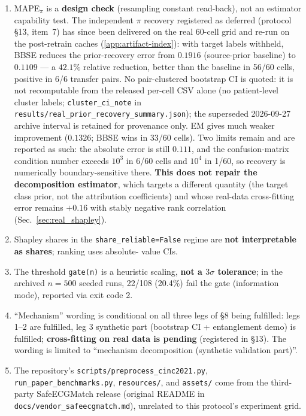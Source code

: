 \documentclass[final,5p,times,nonatbib]{elsarticle}
\begin{document}
\begin{enumerate}
    \item MAPE$_\pi$ is a \textbf{design check} (resampling constant
    read-back), not an estimator capability test. The independent $\pi$
    recovery registered as deferred (protocol \S13, item~7) has since
    been delivered on the real 60-cell grid and re-run on the
    post-retrain caches
    (\ref{app:artifact-index}): with target labels withheld,
    BBSE reduces the prior-recovery error from $0.1916$ (source-prior
    baseline) to $0.1109$ --- a $42.1\%$ relative reduction, better than
    the baseline in 56/60 cells, positive in 6/6 transfer pairs. No
    pair-clustered bootstrap CI is quoted: it is not recomputable from
    the released per-cell CSV alone (no patient-level cluster labels;
    \texttt{cluster\_ci\_note} in
    \texttt{results/real\_prior\_recovery\_summary.json}); the superseded
    2026-09-27 archive interval is retained for provenance only.
    EM gives much
    weaker improvement ($0.1326$; BBSE wins in 33/60 cells). Two limits
    remain and are reported as such:
    the absolute error is still $0.111$, and the confusion-matrix
    condition number exceeds $10^3$ in 6/60 cells and $10^4$ in 1/60, so
    recovery is numerically boundary-sensitive there. \textbf{This does
    not repair the decomposition estimator}, which targets a different
    quantity (the target class prior, not the attribution coefficients)
    and whose real-data cross-fitting error remains $+0.16$ with stably
    negative rank correlation (Sec.~\ref{sec:real_shapley}).
    \item Shapley shares in the \texttt{share\_reliable=False} regime
    are \textbf{not interpretable as shares}; ranking uses absolute-
    value CIs.
    \item The threshold \texttt{gate(n)} is a heuristic scaling,
    \textbf{not a $3\sigma$ tolerance}; in the archived $n=500$
    seeded runs, 22/108 (20.4\%) fail the gate (information mode),
    reported via exit code 2.
    \item ``Mechanism'' wording is conditional on all three legs of
    \S8 being fulfilled: legs 1--2 are fulfilled, leg 3 synthetic part
    (bootstrap CI + entanglement demo) is fulfilled;
    \textbf{cross-fitting on real data is pending} (registered in
    \S13). The wording is limited to ``mechanism decomposition
    (synthetic validation part)''.
    \item The repository's \texttt{scripts/preprocess\_cinc2021.py},
    \texttt{run\_paper\_benchmarks.py}, \texttt{resources/}, and
    \texttt{assets/} come from the third-party SafeECGMatch release
    (original README in \texttt{docs/vendor\_safeecgmatch.md}),
    unrelated to this protocol's experiment grid.
\end{enumerate}
\end{document}
